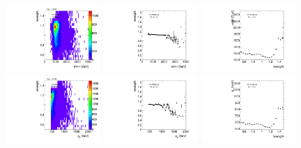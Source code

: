 \begin{figure}[htbp!]
\begin{center}
\includegraphics[width=0.32\textwidth,angle=-90]{figures/boosted/AppendixReweight/Weights/2Trk_split_Signal_mHH_l_weight.pdf}
\includegraphics[width=0.32\textwidth,angle=-90]{figures/boosted/AppendixReweight/Weights/2Trk_split_Signal_mHH_l_weight_profx.pdf}
\includegraphics[width=0.32\textwidth,angle=-90]{figures/boosted/AppendixReweight/Weights/2Trk_split_Signal_mHH_l_weight_profy.pdf}\\
\includegraphics[width=0.32\textwidth,angle=-90]{figures/boosted/AppendixReweight/Weights/2Trk_split_Signal_leadHCand_Pt_m_weight.pdf}
\includegraphics[width=0.32\textwidth,angle=-90]{figures/boosted/AppendixReweight/Weights/2Trk_split_Signal_leadHCand_Pt_m_weight_profx.pdf}
\includegraphics[width=0.32\textwidth,angle=-90]{figures/boosted/AppendixReweight/Weights/2Trk_split_Signal_leadHCand_Pt_m_weight_profy.pdf}\\

\end{center}
\end{figure}
